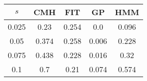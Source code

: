 \centering \begin{tabular}{c|c|c|c|c}
$s$	&CMH	&FIT	&GP	&HMM\\\hline
0.025	&0.23	&0.254	&0.0	&0.096\\
0.05	&0.374	&0.258	&0.006	&0.228\\
0.075	&0.438	&0.228	&0.016	&0.32\\
0.1	&0.7	&0.21	&0.074	&0.574\\
\end{tabular}
